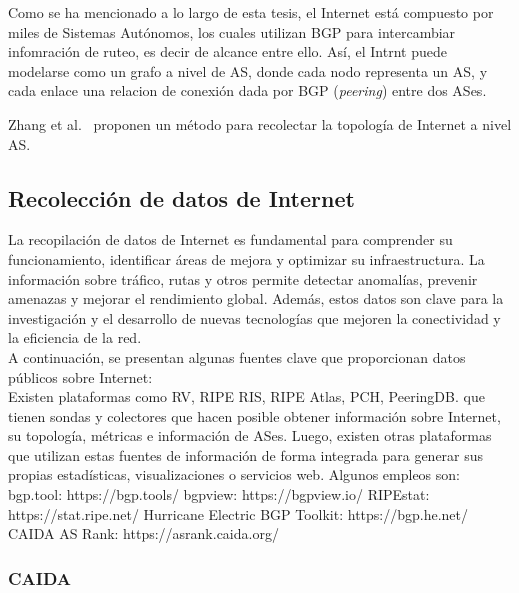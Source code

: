 Como se ha mencionado a lo largo de esta tesis, el Internet está compuesto por miles de Sistemas Autónomos, los cuales utilizan BGP para intercambiar infomración de ruteo, es decir de alcance entre ello.
Así, el Intrnt puede modelarse como un grafo a nivel de AS, donde cada nodo representa un AS, y cada enlace una relacion de conexión dada por BGP (\textit{peering}) entre dos ASes.

Zhang et al.~\cite{AS-topology-2004} proponen un método para recolectar la topología de Internet a nivel AS.




\subsection{Recolección de datos de Internet} \label{sec:anexo_recoleccion_datos_internet}



La recopilación de datos de Internet es fundamental para comprender su funcionamiento, identificar áreas de mejora y optimizar su infraestructura. La información sobre tráfico, rutas y otros permite detectar anomalías, prevenir amenazas y mejorar el rendimiento global. Además, estos datos son clave para la investigación y el desarrollo de nuevas tecnologías que mejoren la conectividad y la eficiencia de la red.\\

A continuación, se presentan algunas fuentes clave que proporcionan datos públicos sobre Internet:\\



Existen plataformas como RV, RIPE RIS, RIPE Atlas, PCH, PeeringDB. que tienen sondas y  colectores que hacen posible obtener información sobre Internet, su topología, métricas e información de ASes.
Luego, existen otras plataformas que utilizan estas fuentes de información de forma integrada para generar sus propias estadísticas, visualizaciones o servicios web. Algunos empleos son:
bgp.tool: https://bgp.tools/
bgpview: https://bgpview.io/
RIPEstat:  https://stat.ripe.net/
Hurricane Electric BGP Toolkit: https://bgp.he.net/
CAIDA AS Rank: https://asrank.caida.org/


\subsubsection{CAIDA} \label{sec:anexo_caida} 


